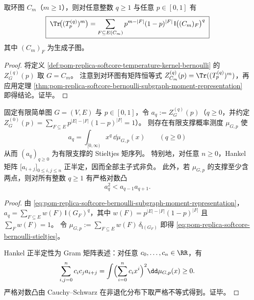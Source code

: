 \begin{corollary}\label{cor:pom-replica-softcore-cycle-trace-bernoulli-moment}
取环图 \(C_m\)（\(m\ge 1\)），则对任意整数 \(q\ge 1\) 与任意 \(p\in[0,1]\) 有
\begin{equation}\label{eq:pom-replica-softcore-cycle-trace-bernoulli-moment}
\boxed{\;
\Tr\!\bigl((T^{(q)}_p)^m\bigr)
=\sum_{F\subseteq E(C_m)}p^{m-|F|}(1-p)^{|F|}\,\mathsf{I}\bigl((C_m)_F\bigr)^{q}\;}
\end{equation}
其中 \((C_m)_F\) 为生成子图。
\end{corollary}
\begin{proof}
将定义 \ref{def:pom-replica-softcore-temperature-kernel-bernoulli} 的 \(Z_G^{(q)}(p)\) 取 \(G=C_m\)。
注意到对环图有矩阵恒等式 \(Z_{C_m}^{(q)}(p)=\Tr((T^{(q)}_p)^m)\)，再应用定理 \ref{thm:pom-replica-softcore-bernoulli-subgraph-moment-representation} 即得结论。证毕。
\end{proof}

\begin{proposition}\label{prop:pom-replica-softcore-bernoulli-stieltjes-hankel}
固定有限简单图 \(G=(V,E)\) 与 \(p\in[0,1]\)，令 \(a_q:=Z_G^{(q)}(p)\)（\(q\ge 0\)，并约定 \(Z_G^{(0)}(p)=\sum_{F\subseteq E}p^{|E|-|F|}(1-p)^{|F|}=1\)）。
则存在有限支撑概率测度 \(\mu_{G,p}\) 使
\begin{equation}\label{eq:pom-replica-softcore-bernoulli-stieltjes}
\boxed{\;
a_q=\int_{[0,\infty)} x^{q}\,\dd\mu_{G,p}(x)\qquad(q\ge 0)\;}
\end{equation}
从而 \((a_q)_{q\ge 0}\) 为有限支撑的 Stieltjes 矩序列。
特别地，对任意 \(n\ge 0\)，Hankel 矩阵 \(\bigl[a_{i+j}\bigr]_{0\le i,j\le n}\) 正半定，因而全部主子式非负。
此外，若 \(\mu_{G,p}\) 的支撑至少含两点，则对所有整数 \(q\ge 1\) 有严格对数凸
\[
a_q^2<a_{q-1}a_{q+1}.
\]
\end{proposition}
\begin{proof}
由 \eqref{eq:pom-replica-softcore-bernoulli-subgraph-moment-representation}，
\(
a_q=\sum_{F\subseteq E}w(F)\,\mathsf{I}(G_F)^q
\)，其中 \(w(F)=p^{|E|-|F|}(1-p)^{|F|}\) 且 \(\sum_F w(F)=1\)。
令
\(
\mu_{G,p}:=\sum_{F\subseteq E}w(F)\,\delta_{\mathsf{I}(G_F)}
\)
即得 \eqref{eq:pom-replica-softcore-bernoulli-stieltjes}。
\par
Hankel 正半定性为 Gram 矩阵表述：对任意 \(c_0,\dots,c_n\in\RR\)，有
\[
\sum_{i,j=0}^{n}c_ic_j a_{i+j}
=\int\Bigl(\sum_{i=0}^{n}c_i x^i\Bigr)^2\dd\mu_{G,p}(x)\ge 0.
\]
严格对数凸由 Cauchy--Schwarz 在非退化分布下取严格不等式得到。证毕。
\end{proof}

